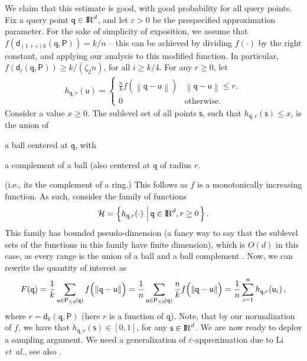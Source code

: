 \documentclass[12pt]{article}
\theoremstyle{remark}{\theorembodyfont{\rm} \newtheorem{remark}[theorem]{Remark}}
\newcommand{\eqlab}[1]{\label{equation:#1}}
\newcommand{\MakeBig}{\rule[-.2cm]{0cm}{0.4cm}}
\newcommand{\sep}[1]{\,\left|\, {#1} \MakeBig\right.}
\newcommand{\pth}[2][\!]{#1\left({#2}\right)}
\newcommand{\normY}[2]{\left\lVert {#1} - {#2} \right \rVert}
\newcommand{\distPk}[3]{\mathsf{d}_{#3}\pth{#2,#1}}
\newcommand{\eps}{{\varepsilon}}\newcommand{\divides}{|}
\newcommand{\etal}{\textit{et~al.}\xspace}
\renewcommand{\Re}{{\rm I\!\hspace{-0.025em} R}}
\newcommand{\PntSet}{\mathsf{P}}
\newcommand{\query}{\mathtt{q}}
\newcommand{\pntA}{\mathsf{u}}
\newcommand{\pntC}{\mathsf{s}}
\newcommand{\distY}[2]{\normY{#1}{#2}}
\newcommand{\constC}{\zeta_2}
\newcommand{\Pk}[2][\!]{\PntSet_{\leq k}\pth[#1]{#2}}
\newcommand{\Family}{\mathcal{H}}\newcommand{\dhalf}[2][\!]{\mathsf{d}_{n/2}\pth[#1]{#2}}
\begin{document}
We claim that this estimate is good, with good probability for all
query points.  Fix a query point $\query \in \Re^d$, and let $\eps >
0$ be the prespecified approximation parameter.  For the sake of
simplicity of exposition, we assume that
$f\pth{\distPk{\PntSet}{\query}{(1+\eps)k}} = k/n$ -- this can be
achieved by dividing $f(\cdot)$ by the right constant, and applying
our analysis to this modified function. In particular,
$f\pth{\distPk{\PntSet}{\query}{i}} \geq k/(\constC n)$, for all $i
\geq k/4$. For any $r \geq 0$, let
\begin{align*}
    h_{\query,r}(\pntA) = \left\{ \begin{array}{ll}
            \frac{n}{k}f\pth{\distY{\query}{\pntA}} &
            \distY{\query}{\pntA} \leq
            r, \\
            0 & \text{otherwise}.
           \end{array}
       \right.
\end{align*}
Consider a value $x\geq 0$. The sublevel set of all points $\pntC$,
such that $h_{\query,r}(\pntC) \leq x$, is the union of
\begin{inparaenum}[(i)]
    \item a ball centered at $\query$, with 
    \item a complement of a ball (also centered at $\query$ of radius
    $r$.
\end{inparaenum}
(i.e., its the complement of a ring.)  This follows as $f$ is a
monotonically increasing function. As such, consider the family of
functions
\begin{align*}
    \Family = \brc{ h_{\query,r}(\cdot) \sep{ \query \in \Re^d, r \geq
          0}}.
\end{align*}
This family has bounded pseudo-dimension (a fancy way to say that the
sublevel sets of the functions in this family have finite \VC
dimension), which is $O(d)$ in this case, as every range is the union
of a ball and a ball complement \cite[Section 5.2.1.1]{h-gaa-11}.
Now, we can rewrite the quantity of interest as
\begin{align}
    F(\query)=\frac{1}{k}\sum_{\pntA \in \Pk{\query}} f\pth{\MakeBig\!
       \distY{\query}{\pntA} }=\frac{1}{n} \sum_{\pntA \in \Pk{\query}} \frac{n}{k}
    f\pth{\MakeBig\!  \distY{\query}{\pntA} }=\frac{1}{n} \sum_{i=1}^n h_{\query,r}\pth{ \pntA_i},
\eqlab{F:q}
\end{align}
where $r= \distPk{\PntSet}{\query}{k}$ (here $r$ is a function of
$\query$).  Note, that by our normalization of $f$, we have that $
h_{\query,r}\pth{ \pntC } \in [0,1]$, for any $\pntC \in \Re^d$. We
are now ready to deploy a sampling argument. We need a generalization
of $\eps$-approximation due to Li \etal \cite{lls-ibscl-01}, see also
\cite{h-gaa-11}.
\end{document}
